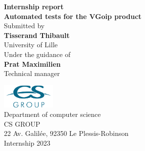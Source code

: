 \begin{titlepage}
    \begin{center}
        \textup{\small {\bf Internship report}}\\[0.3in]

        \Large \textbf {Automated tests for the VGoip product}\\[0.7in]

        \normalsize Submitted by\\[0.2in]
        \textbf{Tisserand Thibault}\\
        University of Lille\\

        \vspace{.2in}
        Under the guidance of\\[0.2in]
        \textbf{Prat Maximilien}\\
        Technical manager

        \vspace{.3in}

        \includegraphics[width=0.2\textwidth]{img/csgroup.png}\\[0.1in]
        \Large{Department of computer science}\\
        \normalsize
        \textsc{CS GROUP}\\
        22 Av. Galilée, 92350 Le Plessis-Robinson\\
        \vspace{0.2cm}
        Internship 2023
    \end{center}
\end{titlepage}